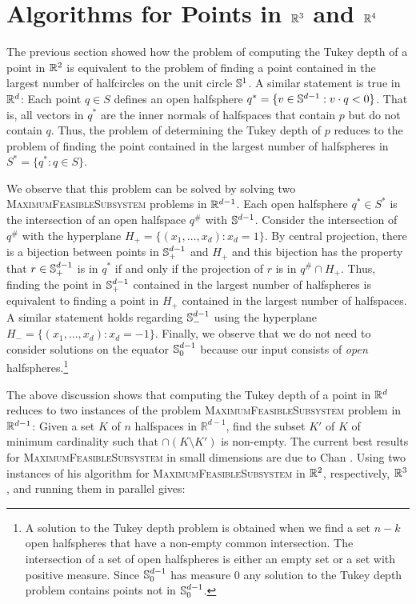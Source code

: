 \documentclass[charterfonts,lotsofwhite]{patmorin}
\begin{document}
\section{Algorithms for Points in $\mathbb{R}^3$ and $\mathbb{R}^4$}

The previous section showed how the problem of computing the Tukey
depth of a point in $\mathbb{R}^2$ is equivalent to the problem of finding a
point contained in the largest number of halfcircles on the unit
circle $\mathbb{S}^1$.  A similar statement is true in $\mathbb{R}^d$:  Each point
$q\in S$ defines an open halfsphere $q^*=\{ v\in\mathbb{S}^{d-1} : v\cdot q <
0\}$.  That is, all vectors in $q^*$ are the inner normals of
halfspaces that contain $p$ but do not contain $q$.  Thus, the problem
of determining the Tukey depth of $p$ reduces to the problem of
finding the point contained in the largest number of halfspheres in
$S^*=\{q^* : q\in S\}$.

We observe that this problem can be solved by solving two
\textsc{MaximumFeasibleSubsystem} problems in $\mathbb{R}^{d-1}$.  Each open
halfsphere $q^*\in S^*$ is the intersection of an open halfspace
$q^\#$ with $\mathbb{S}^{d-1}$.  Consider the intersection of $q^\#$ with the
hyperplane $H_+=\{(x_1,\ldots,x_d):x_d=1\}$.  By central projection,
there is a bijection between points in $\mathbb{S}^{d-1}_+$ and $H_+$ and
this bijection has the property that $r\in\mathbb{S}^{d-1}_+$ is in $q^*$ if
and only if the projection of $r$ is in $q^\#\cap H_+$.  Thus, finding
the point in $\mathbb{S}^{d-1}_+$ contained in the largest number of
halfspheres is equivalent to finding a point in $H_+$ contained in the
largest number of halfspaces.  A similar statement holds regarding
$\mathbb{S}^{d-1}_-$ using the hyperplane $H_-=\{(x_1,\ldots,x_d):x_d=-1\}$.
Finally, we observe that we do not need to consider solutions on the
equator $\mathbb{S}^{d-1}_0$ because our input consists of \emph{open}
halfspheres.\footnote{A solution to the Tukey depth problem is
obtained when we find a set $n-k$ open halfspheres that have a
non-empty common intersection.  The intersection of a set of open
halfspheres is either an empty set or a set with positive measure.
Since $\mathbb{S}^{d-1}_0$ has measure 0 any solution to the Tukey depth
problem contains points not in $\mathbb{S}^{d-1}_0$.}

The above discussion shows that computing the Tukey depth of a point
in $\mathbb{R}^d$ reduces to two instances of the problem
\textsc{MaximumFeasibleSubsystem} problem in $\mathbb{R}^{d-1}$: Given a set
$K$ of $n$ halfspaces in $\mathbb{R}^{d-1}$, find the subset $K'$ of
$K$ of minimum cardinality such that $\cap (K\setminus K')$ is
non-empty.  The current best results for
\textsc{MaximumFeasibleSubsystem} in small dimensions are due to Chan
\cite{c05}.  Using two instances of his algorithm for
\textsc{MaximumFeasibleSubsystem} in $\mathbb{R}^2$, respectively, $\mathbb{R}^3$, and
running them in parallel gives:
\end{document}
